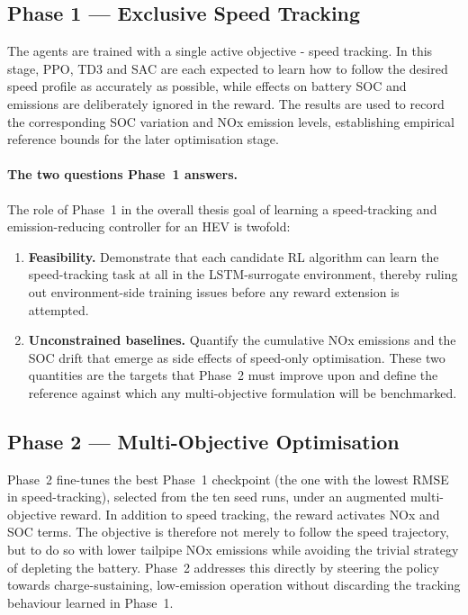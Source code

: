 \subsection{Phase 1 — Exclusive Speed Tracking}
\label{subsec:method_phase1}
The agents are trained with a single active objective - speed tracking. In this stage, \ac{PPO}, \ac{TD3} and \ac{SAC} are each expected to learn how to follow the desired speed profile as accurately as possible, while effects on battery \ac{SOC} and emissions are deliberately ignored in the reward. The results are used to record the corresponding \ac{SOC} variation and \ac{NOx} emission levels, establishing empirical reference bounds for the later optimisation stage.

\paragraph{The two questions Phase~1 answers.}
The role of Phase~1 in the overall thesis goal of learning a speed-tracking and emission-reducing controller for an HEV is twofold:

\begin{enumerate}
  \item \textbf{Feasibility.} Demonstrate that each candidate \ac{RL} algorithm can learn the speed-tracking task at all in the \ac{LSTM}-surrogate environment, thereby ruling out environment-side training issues before any reward extension is attempted.
  \item \textbf{Unconstrained baselines.} Quantify the cumulative \ac{NOx} emissions and the \ac{SOC} drift that emerge as side effects of speed-only optimisation. These two quantities are the targets that Phase~2 must improve upon and define the reference against which any multi-objective formulation will be benchmarked.
\end{enumerate}

\subsection{Phase 2 — Multi-Objective Optimisation}
\label{subsec:method_phase2}
Phase~2 fine-tunes the best Phase~1 checkpoint (the one with the lowest RMSE in speed-tracking), selected from the ten seed runs, under an augmented multi-objective reward. In addition to speed tracking, the reward activates \ac{NOx} and \ac{SOC} terms. The objective is therefore not merely to follow the speed trajectory, but to do so with lower tailpipe \ac{NOx} emissions while avoiding the trivial strategy of depleting the battery. Phase~2 addresses this directly by steering the policy towards charge-sustaining, low-emission operation without discarding the tracking behaviour learned in Phase~1.

